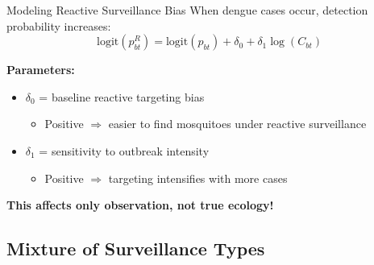 \documentclass[aspectratio=169]{beamer}
\begin{document}
\begin{frame}{Modeling Reactive Surveillance Bias}
  When dengue cases occur, detection probability increases:
  \begin{equation*}
    \text{logit}(p_{bt}^R) = \text{logit}(p_{bt}) + \delta_0 + \delta_1 \log(C_{bt})
  \end{equation*}
  
  \vspace{1cm}
  
  \textbf{Parameters:}
  \begin{itemize}
    \item $\delta_0$ = baseline reactive targeting bias
      \begin{itemize}
        \item Positive $\Rightarrow$ easier to find mosquitoes under reactive surveillance
      \end{itemize}
    \item $\delta_1$ = sensitivity to outbreak intensity
      \begin{itemize}
        \item Positive $\Rightarrow$ targeting intensifies with more cases
      \end{itemize}
  \end{itemize}
  
  \vspace{1cm}
  
  \textbf{This affects only observation, not true ecology!}
\end{frame}

\subsection{Mixture of Surveillance Types}
\end{document}
